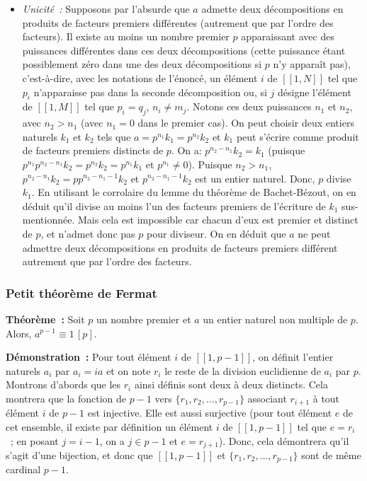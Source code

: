 \begin{itemize}
    \item \textit{Unicité :} 
        Supposons par l'absurde que $a$ admette deux décompositions en produits de facteurs premiers différentes (autrement que par l'ordre des facteurs). 
        Il existe au moins un nombre premier $p$ apparaissant avec des puissances différentes dans ces deux décompositions (cette puissance étant possiblement zéro dans une des deux décompositions si $p$ n'y apparaît pas), c'est-à-dire, avec les notations de l'énoncé, un élément $i$ de $[\![1,N]\!]$ tel que $p_i$ n'apparaisse pas dans la seconde décomposition ou, si $j$ désigne l'élément de $[\![1,M]\!]$ tel que $p_i = q_j$, $n_i \neq m_j$. 
        Notons ces deux puissances $n_1$ et $n_2$, avec $n_2 > n_1$ (avec $n_1 = 0$ dans le premier cas). 
        On peut choisir deux entiers naturels $k_1$ et $k_2$ tels que $a = p^{n_1} k_1 = p^{n_2} k_2$ et $k_1$ peut s'écrire comme produit de facteurs premiers distincts de $p$. 
        On a: $p^{n_2 - n_1} k_2 = k_1$ (puisque $p^{n_1} p^{n_2 - n_1} k_2 = p^{n_2} k_2 = p^{n_1} k_1$ et $p^{n_1} \neq 0$). 
        Puisque $n_2 > n_1$, $p^{n_2 - n_1} k_2 = p p^{n_2 - n_1 - 1} k_2$ et $p^{n_2 - n_1 - 1} k_2$ est un entier naturel.
        Donc, $p$ divise $k_1$. 
        En utilisant le corrolaire du lemme du théorème de Bachet-Bézout, on en déduit qu'il divise au moins l'un des facteurs premiers de l'écriture de $k_1$ sus-mentionnée. 
        Mais cela est impossible car chacun d'eux est premier et distinct de $p$, et n'admet donc pas $p$ pour diviseur.
    On en déduit que $a$ ne peut admettre deux décompositions en produits de facteurs premiers différent autrement que par l'ordre des facteurs.
\end{itemize}

\done

\subsubsection{Petit théorème de Fermat}

\noindent\textbf{Théorème :} Soit $p$ un nombre premier et $a$ un entier naturel non multiple de $p$. 
Alors, $a^{p-1} \equiv 1 \, [p]$.

\medskip

\noindent\textbf{Démonstration :} Pour tout élément $i$ de $[\![1, p-1]\!]$, on définit l'entier naturels $a_i$ par $a_i = i a$ et on note $r_i$ le reste de la division euclidienne de $a_i$ par $p$. 
Montrons d'abords que les $r_i$ ainsi définis sont deux à deux distincts. 
Cela montrera que la fonction de $p-1$ vers $\lbrace r_1, r_2, \dots, r_{p-1} \rbrace$ associant $r_{i+1}$ à tout élément $i$ de $p-1$ est injective.
Elle est aussi surjective (pour tout élément $e$ de cet ensemble, il existe par définition un élément $i$ de $[\![1,p-1]\!]$ tel que $e = r_i$ ; en posant $j = i-1$, on a $j \in p-1$ et $e = r_{j+1}$). 
Donc, cela démontrera qu'il s'agit d'une bijection, et donc que $[\![1, p-1]\!]$ et $\lbrace r_1, r_2, \dots, r_{p-1} \rbrace$ sont de même cardinal $p-1$.

